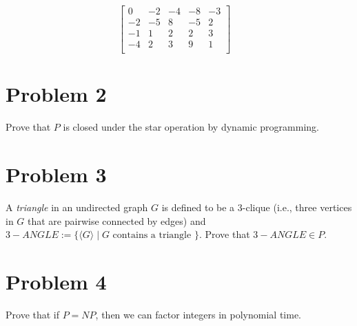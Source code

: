 \documentclass[12pt]{article}
\begin{document}
$$
\begin{bmatrix} 
0  & -2 & -4 & -8 & -3 \\
-2 & -5 & 8  & -5 & 2  \\
-1 & 1  & 2  &  2 & 3  \\
-4 & 2  & 3  &  9 & 1  \\
\end{bmatrix}
\quad
$$

\section*{Problem 2}
Prove that $P$ is closed under the star operation by dynamic programming.

\section*{Problem 3}
A \emph{triangle} in an undirected graph $G $ is defined to be a 3-clique (i.e., three vertices in $G$ that are pairwise connected by edges)
and $3-ANGLE := \{ \langle G \rangle \mid G \mbox{ contains a triangle }\}$. Prove that $3-ANGLE \in P$. 

\section*{Problem 4}
Prove that if $P = NP$, then we can factor integers in polynomial time.
\end{document}
